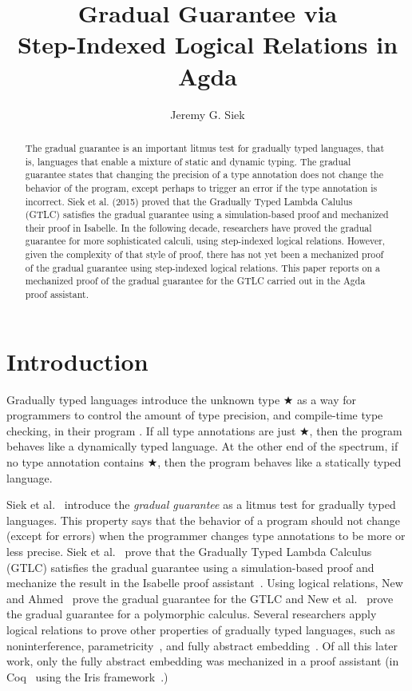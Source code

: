 \documentclass[submission,copyright,creativecommons]{eptcs}
\title{Gradual Guarantee via \\ Step-Indexed Logical Relations in Agda}
\author{Jeremy G. Siek
\institute{School of Informatics, Computing, and Engineering\\
Indiana University \\
Bloomington, IN, USA}
\email{jsiek@iu.edu}
}
\begin{document}
\maketitle

\begin{abstract}
  The gradual guarantee is an important litmus test for gradually
  typed languages, that is, languages that enable a mixture of static
  and dynamic typing. The gradual guarantee states that changing the
  precision of a type annotation does not change the behavior of the
  program, except perhaps to trigger an error if the type annotation
  is incorrect. Siek et al. (2015) proved that the Gradually Typed
  Lambda Calulus (GTLC) satisfies the gradual guarantee using a
  simulation-based proof and mechanized their proof in Isabelle. In
  the following decade, researchers have proved the gradual guarantee
  for more sophisticated calculi, using step-indexed logical
  relations.  However, given the complexity of that style of proof,
  there has not yet been a mechanized proof of the gradual guarantee
  using step-indexed logical relations. This paper reports on a
  mechanized proof of the gradual guarantee for the GTLC carried out
  in the Agda proof assistant.
\end{abstract}

\section{Introduction}

Gradually typed languages introduce the unknown type ★ as a way for
programmers to control the amount of type precision, and compile-time
type checking, in their program \cite{Siek:2006bh,Siek:2007qy}. If all
type annotations are just ★, then the program behaves like a
dynamically typed language. At the other end of the spectrum, if no
type annotation contains ★, then the program behaves like a statically
typed language.

Siek et al.~\cite{Siek:2015ac} introduce the \emph{gradual guarantee}
as a litmus test for gradually typed languages.  This property says
that the behavior of a program should not change (except for errors)
when the programmer changes type annotations to be more or less
precise.  Siek et al.~\cite{Siek:2015ac} prove that the Gradually
Typed Lambda Calculus (GTLC) satisfies the gradual guarantee using a
simulation-based proof and mechanize the result in the Isabelle proof
assistant~\cite{Nipkow:2002jl}. Using logical relations, New and
Ahmed~\cite{New:2018aa} prove the gradual guarantee for the GTLC and
New et al.~\cite{New:2019ab} prove the gradual guarantee for a
polymorphic calculus. Several researchers apply logical relations to
prove other properties of gradually typed languages, such as
noninterference\cite{Toro:2018aa},
parametricity~\cite{Ahmed:2011fk,New:2019ab,Labrada:2020tk}, and fully
abstract embedding~\cite{Jacobs:2021aa}. Of all this later work, only
the fully abstract embedding was mechanized in a proof assistant (in
Coq~\cite{The-Coq-Development-Team:2004kf} using the Iris
framework~\cite{JUNG:2018aa}.)
\end{document}
